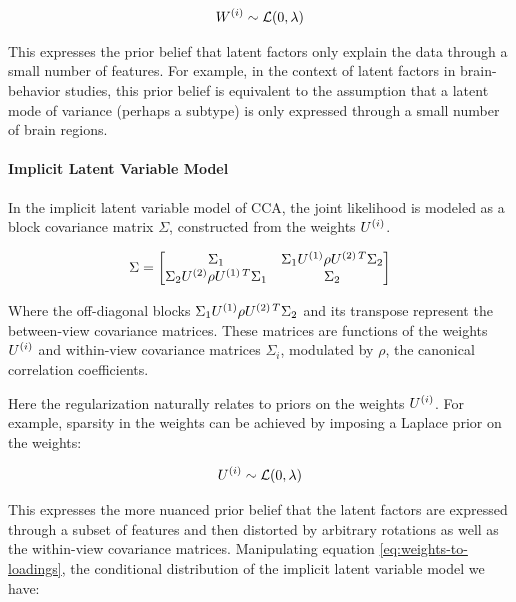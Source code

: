 \begin{align}
    W^{(i)} \sim \mathcal{L}(0, \lambda)
\end{align}

This expresses the prior belief that latent factors only explain the data through a small number of features.
For example, in the context of latent factors in brain-behavior studies, this prior belief is equivalent to the assumption that a latent mode of variance (perhaps a subtype) is only expressed through a small number of brain regions.

\paragraph{Implicit Latent Variable Model}
In the implicit latent variable model of CCA, the joint likelihood is modeled as a block covariance matrix \(\Sigma\)\citep{suo2017sparse}, constructed from the weights \(U^{(i)}\).

\begin{equation}
    \Sigma = \begin{bmatrix}
                 \Sigma_{1} & \Sigma_{1} U^{(1)} \rho U^{(2)\,T} \Sigma_{2} \\
                 \Sigma_{2} U^{(2)} \rho U^{(1)\,T} \Sigma_{1} & \Sigma_{2}
    \end{bmatrix}
\end{equation}

Where the off-diagonal blocks \(\Sigma_{1} U^{(1)} \rho U^{(2)\,T} \Sigma_{2}\) and its transpose represent the between-view covariance matrices.
These matrices are functions of the weights \(U^{(i)}\) and within-view covariance matrices \(\Sigma_{i}\), modulated by \(\rho\), the canonical correlation coefficients.

Here the regularization naturally relates to priors on the weights \(U^{(i)}\).
For example, sparsity in the weights can be achieved by imposing a Laplace prior on the weights:

\begin{align}
    U^{(i)} \sim \mathcal{L}(0, \lambda)
\end{align}

This expresses the more nuanced prior belief that the latent factors are expressed through a subset of features and then distorted by arbitrary rotations as well as the within-view covariance matrices.
Manipulating equation \ref{eq:weights-to-loadings}, the conditional distribution of the implicit latent variable model we have:

